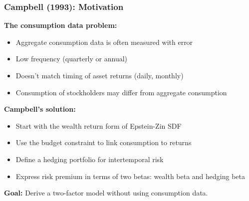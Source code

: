 \documentclass{beamer}
\begin{document}
\begin{frame}
    \frametitle{Campbell (1993): Motivation}

    \textbf{The consumption data problem:}
    \begin{itemize}
        \item Aggregate consumption data is often measured with error
        \item Low frequency (quarterly or annual)
        \item Doesn't match timing of asset returns (daily, monthly)
        \item Consumption of stockholders may differ from aggregate consumption
    \end{itemize}

    \textbf{Campbell's solution:}
    \begin{itemize}
        \item Start with the wealth return form of Epstein-Zin SDF
        \item Use the budget constraint to link consumption to returns
        \item Define a hedging portfolio for intertemporal risk
        \item Express risk premium in terms of two betas: wealth beta and hedging beta
    \end{itemize}

    \textbf{Goal:} Derive a two-factor model without using consumption data.
\end{frame}
\end{document}
